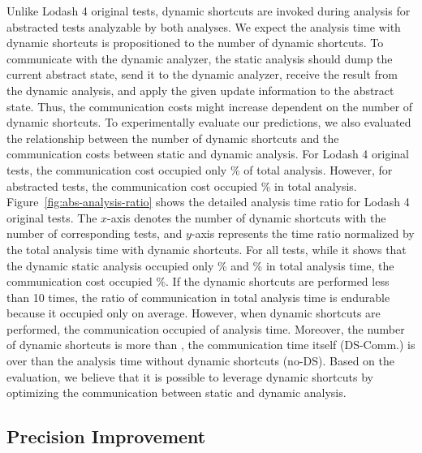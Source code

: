 Unlike Lodash 4 original tests,  dynamic shortcuts are invoked during
analysis for  abstracted tests analyzable by both analyses.  We expect
the analysis time with dynamic shortcuts is propositioned to the number of
dynamic shortcuts. To communicate with the dynamic analyzer, the static analysis
should dump the current abstract state, send it to the dynamic analyzer, receive
the result from the dynamic analysis, and apply the given update information to
the abstract state.  Thus, the communication costs might increase dependent on
the number of dynamic shortcuts.  To experimentally evaluate our predictions,
we also evaluated the relationship between the number of dynamic shortcuts and
the communication costs between static and dynamic analysis.  For 
Lodash 4 original tests, the communication cost occupied only \% of
total analysis.  However, for  abstracted tests, the communication
cost occupied \% in total analysis.
Figure~\ref{fig:abs-analysis-ratio} shows the detailed analysis time ratio for
 Lodash 4 original tests.  The $x$-axis denotes the number of dynamic
shortcuts with the number of corresponding tests, and $y$-axis represents the
time ratio normalized by the total analysis time with dynamic shortcuts.  For
all  tests, while it shows that the dynamic static analysis occupied
only \% and \% in total analysis time, the
communication cost occupied \%.  If the dynamic shortcuts are
performed less than 10 times, the ratio of communication in total analysis time
is endurable because it occupied only  on average.   However,
when  dynamic shortcuts are performed, the communication occupied
 of analysis time.  Moreover, the number of dynamic shortcuts is
more than , the communication time itself (DS-Comm.) is over than the
analysis time without dynamic shortcuts (no-DS).  Based on the evaluation, we
believe that it is possible to leverage dynamic shortcuts by optimizing the
communication between static and dynamic analysis.


\subsection{Precision Improvement}

